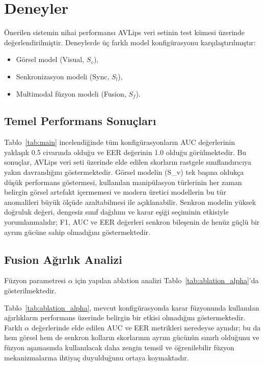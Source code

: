 \documentclass[conference]{IEEEtran}
\begin{document}
\section{Deneyler}

Önerilen sistemin nihai performansı AVLips veri setinin test kümesi üzerinde değerlendirilmiştir. Deneylerde üç farklı model konfigürasyonu karşılaştırılmıştır:

\begin{itemize}
  \item Görsel model (Visual, $S_v$),
  \item Senkronizasyon modeli (Sync, $S_l$),
  \item Multimodal füzyon modeli (Fusion, $S_f$).
\end{itemize}

\subsection{Temel Performans Sonuçları}



Tablo~\ref{tab:main} incelendiğinde tüm konfigürasyonların AUC değerlerinin yaklaşık 0.5 civarında olduğu ve EER değerinin 1.0 olduğu görülmektedir. Bu sonuçlar, AVLips veri seti üzerinde elde edilen skorların rastgele sınıflandırıcıya yakın davrandığını göstermektedir. Görsel modelin (S_v) tek başına oldukça düşük performans göstermesi, kullanılan manipülasyon türlerinin her zaman belirgin görsel artefakt içermemesi ve modern üretici modellerin bu tür anomalileri büyük ölçüde azaltabilmesi ile açıklanabilir. Senkron modelin yüksek doğruluk değeri, dengesiz sınıf dağılımı ve karar eşiği seçiminin etkisiyle yorumlanmalıdır; F1, AUC ve EER değerleri senkron bileşenin de henüz güçlü bir ayrım gücüne sahip olmadığını göstermektedir.

\subsection{Fusion Ağırlık Analizi}

Füzyon parametresi $\alpha$ için yapılan ablation analizi Tablo~\ref{tab:ablation_alpha}'da gösterilmektedir.



Tablo~\ref{tab:ablation_alpha}, mevcut konfigürasyonda karar füzyonunda kullanılan ağırlıkların performans üzerinde belirgin bir etkisi olmadığını göstermektedir. Farklı $\alpha$ değerlerinde elde edilen AUC ve EER metrikleri neredeyse aynıdır; bu da hem görsel hem de senkron kolların skorlarının ayrım gücünün sınırlı olduğunu ve füzyon aşamasında kullanılacak daha zengin temsil ve öğrenilebilir füzyon mekanizmalarına ihtiyaç duyulduğunu ortaya koymaktadır.
\end{document}
